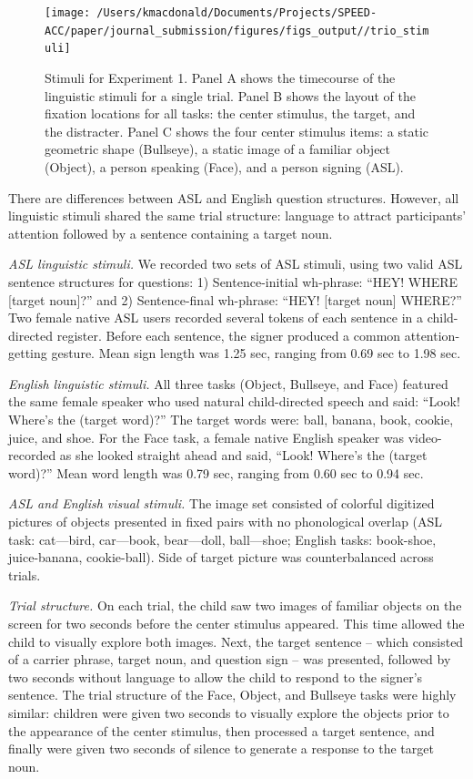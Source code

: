 \documentclass[english,floatsintext,man]{apa6}
\begin{document}
\begin{figure}[!t]

{\centering \texttt{[image: /Users/kmacdonald/Documents/Projects/SPEED-ACC/paper/journal\_submission/figures/figs\_output//trio\_stimuli]} 

}

\caption{Stimuli for Experiment 1. Panel A shows the timecourse of the linguistic stimuli for a single trial. Panel B shows the layout of the fixation locations for all tasks: the center stimulus, the target, and the distracter. Panel C shows the four center stimulus items: a static geometric shape (Bullseye), a static image of a familiar object (Object), a person speaking (Face), and a person signing (ASL).}\label{fig:trio-stim}
\end{figure}

There are differences between ASL and English question structures.
However, all linguistic stimuli shared the same trial structure:
language to attract participants' attention followed by a sentence
containing a target noun.

\emph{ASL linguistic stimuli.} We recorded two sets of ASL stimuli,
using two valid ASL sentence structures for questions: 1)
Sentence-initial wh-phrase: \enquote{HEY! WHERE {[}target noun{]}?} and
2) Sentence-final wh-phrase: \enquote{HEY! {[}target noun{]} WHERE?} Two
female native ASL users recorded several tokens of each sentence in a
child-directed register. Before each sentence, the signer produced a
common attention-getting gesture. Mean sign length was 1.25 sec, ranging
from 0.69 sec to 1.98 sec.

\emph{English linguistic stimuli.} All three tasks (Object, Bullseye,
and Face) featured the same female speaker who used natural
child-directed speech and said: \enquote{Look! Where's the (target
word)?} The target words were: ball, banana, book, cookie, juice, and
shoe. For the Face task, a female native English speaker was
video-recorded as she looked straight ahead and said, \enquote{Look!
Where's the (target word)?} Mean word length was 0.79 sec, ranging from
0.60 sec to 0.94 sec.

\emph{ASL and English visual stimuli.} The image set consisted of
colorful digitized pictures of objects presented in fixed pairs with no
phonological overlap (ASL task: cat---bird, car---book, bear---doll,
ball---shoe; English tasks: book-shoe, juice-banana, cookie-ball). Side
of target picture was counterbalanced across trials.

\emph{Trial structure.} On each trial, the child saw two images of
familiar objects on the screen for two seconds before the center
stimulus appeared. This time allowed the child to visually explore both
images. Next, the target sentence -- which consisted of a carrier
phrase, target noun, and question sign -- was presented, followed by two
seconds without language to allow the child to respond to the signer's
sentence. The trial structure of the Face, Object, and Bullseye tasks
were highly similar: children were given two seconds to visually explore
the objects prior to the appearance of the center stimulus, then
processed a target sentence, and finally were given two seconds of
silence to generate a response to the target noun.
\end{document}
